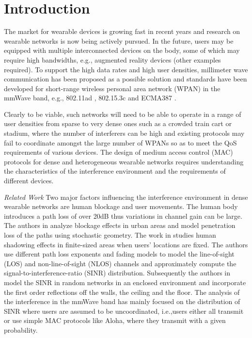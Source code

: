 \documentclass[10pt, conference, letterpaper]{IEEEtran}
\begin{document}
\section{Introduction}\label{section:introduction}

The market for wearable devices is growing fast in recent years \cite{wearable} and research on wearable networks is now being actively pursued. In the future, users may be equipped with multiple interconnected devices on the body, some of which may require high bandwidths, e.g., augmented reality devices (other examples required). To support the high data rates and high user densities, millimeter wave communication has been proposed as a possible solution and standards have been developed for short-range wireless personal area network (WPAN) in the mmWave band, e.g., 802.11ad \cite{80211ad}, 802.15.3c \cite{802153c} and ECMA387 \cite{ECMA387}. 

Clearly to be viable, such networks will need to be able to operate in a range of user densities from sparse to very dense ones such as a crowded train cart or stadium, where the number of interferers can be high and existing protocols may fail to coordinate amongst the large number of WPANs so as to meet the QoS requirements of various devices. The design of medium access control (MAC) protocols for dense and heterogeneous wearable networks requires understanding the characteristics of the interference environment and the requirements of different devices.

\emph{Related Work}
Two major factors influencing the interference environment in dense wearable networks are human blockage and user movements. The human body introduces a path loss of over 20dB \cite{humanshadowing} thus variations in channel gain can be large. The authors in \cite{urbanblockage} analyze blockage effects in urban areas and model penetration loss of the paths using stochastic geometry. The work in \cite{interferencefinitesized} studies human shadowing effects in finite-sized areas when users' locations are fixed. The authors use different path loss exponents and fading models to model the line-of-sight (LOS) and non-line-of-sight (NLOS) channels and approximately compute the signal-to-interference-ratio (SINR) distribution. Subsequently the authors in \cite{enclosedmmwave} model the SINR in random networks in an enclosed environment and incorporate the first order reflections off the walls, the ceiling and the floor. The analysis of the interference in the mmWave band has mainly focused on the distribution of SINR where users are assumed to be uncoordinated, i.e.,users  either all transmit or use simple MAC protocols like Aloha, where they transmit with a given probability. 
\end{document}
